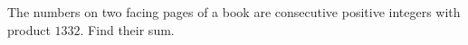 The numbers on two facing pages of a book are consecutive positive integers with product $1332$. Find their sum.
